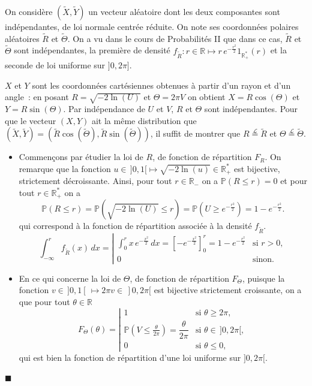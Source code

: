 \begin{preuve}
On considère \((\widetilde{X},\widetilde{Y})\) un vecteur aléatoire dont
les deux composantes sont indépendantes, de loi normale centrée réduite.
On note ses coordonnées polaires aléatoires \(\widetilde{R}\) et
\(\widetilde{\Theta}\). On a vu dans le cours de Probabilités II que
dans ce cas, \(\widetilde{R}\) et \(\widetilde{\Theta}\) sont
indépendantes, la première de densité
\(f_{\widetilde{R}} : r \in \mathbb{R}\mapsto r\,e^{-\frac{r^2}{2}} 1_{\mathbb{R}_+^\ast}(r)\)
et la seconde de loi uniforme sur \(]0,2\pi]\).

\(X\) et \(Y\) sont les coordonnées cartésiennes obtenues à partir d'un
rayon et d'un angle~: en posant \(R = \sqrt{-2\ln(U)}\) et
\(\Theta = 2\pi V\) on obtient \(X =R\cos(\Theta)\) et
\(Y = R\sin(\Theta)\). Par indépendance de \(U\) et \(V\), \(R\) et
\(\Theta\) sont indépendantes. Pour que le vecteur \((X,Y)\) ait la même
distribution que
\((\widetilde{X},\widetilde{Y}) = \left(\widetilde{R}\cos(\widetilde{\Theta}),\widetilde{R}\sin(\widetilde{\Theta})\right)\),
il suffit de montrer que \(R \overset{\mathcal{L}}{=} \widetilde{R}\) et
\(\Theta \overset{\mathcal{L}}{=} \widetilde{\Theta}\).

\begin{itemize}
\item
  Commençons par étudier la loi de \(R\), de fonction de répartition
  \(F_R\). On remarque que la fonction
  \(u\in\, ]0,1[ \mapsto \sqrt{-2\ln(u)} \in \mathbb{R}_+^\ast\) est
  bijective, strictement décroissante. Ainsi, pour tout
  \(r\in\mathbb{R}_-\) on a \(\mathbb{P}\left(R \leq r \right) = 0\) et
  pour tout \(r \in \mathbb{R}_+^\ast\) on a
  \[\mathbb{P}(R \leq r) = \mathbb{P}\left(\sqrt{-2\ln(U)} \leq r \right) = \mathbb{P}\left(U \geq e^{-\frac{r^2}{2}} \right) = 1 - e^{-\frac{r^2}{2}}.\]
  qui correspond à la fonction de répartition associée à la densité
  \(f_{\widetilde{R}}\).
  \[\int_{-\infty}^r f_{\widetilde{R}}(x)\,dx = \left|\begin{array}{ll}\displaystyle \int_0^r x\,e^{-\frac{x^2}{2}}\,dx = \left[-e^{-\frac{x^2}{2}} \right]_0^r = 1 - e^{-\frac{r^2}{2}}  & \text{si } r>0,\\[1em] 0 & \text{sinon.} \end{array}\right.\]
\item
  En ce qui concerne la loi de \(\Theta\), de fonction de répartition
  \(F_\Theta\), puisque la fonction
  \(v \in\, ]0,1[\, \mapsto 2\pi v \in\, ]0,2\pi[\) est bijective
  strictement croissante, on a que pour tout \(\theta \in \mathbb{R}\)
  \[F_\Theta(\theta) = \left|\begin{array}{ll} 1 & \text{si } \theta \geq 2\pi,\\ \mathbb{P}\left(V\leq \frac{\theta}{2\pi} \right) = \dfrac{\theta}{2\pi} & \text{si } \theta \in\, ]0,2\pi[,\\ 0 & \text{si } \theta \leq 0,\end{array}\right.\]
  qui est bien la fonction de répartition d'une loi uniforme sur
  \(]0,2\pi[\).
\end{itemize}

\hfill$\blacksquare$
\end{preuve}


